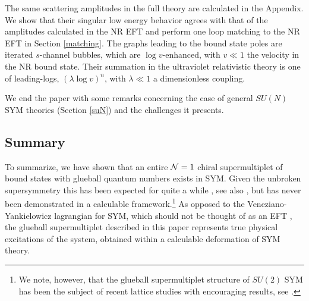 \documentclass[11pt]{article}
\begin{document}
  
The same scattering amplitudes in the full theory are calculated in the Appendix. We show that their singular   low energy behavior  agrees with that of the amplitudes calculated in the NR EFT and perform one loop matching to the NR EFT in Section \ref{matching}. The graphs leading to the bound state poles are iterated $s$-channel bubbles, which are $\log v$-enhanced, with $v \ll 1$ the velocity in the NR bound state. Their summation in the ultraviolet relativistic theory is one of leading-logs, $(\lambda \log v)^n$, with $\lambda \ll 1$ a dimensionless coupling.

We end the paper with some remarks concerning the case of general $SU(N)$ SYM theories (Section \ref{suN}) and the challenges it presents.

\subsection{Summary}

To summarize, we have shown that an entire ${\cal N}=1$ chiral supermultiplet of bound states with glueball quantum numbers exists in SYM. Given the unbroken supersymmetry this has been expected for quite a while  \cite{Veneziano:1982ah}, see also  \cite{Farrar:1997fn}, but has never been demonstrated in a calculable framework.\footnote{We note, however, that the glueball supermultiplet structure of $SU(2)$ SYM  has been the subject of recent lattice studies with encouraging   results, see 
  \cite{Ali:2017iof, Bergner:2015adz}.} As opposed to the Veneziano-Yankielowicz lagrangian for SYM, which should not be thought of as an EFT \cite{Intriligator:1995au}, the glueball supermultiplet described in this paper represents true physical excitations of the system, obtained within a calculable deformation of SYM theory.
\end{document}
